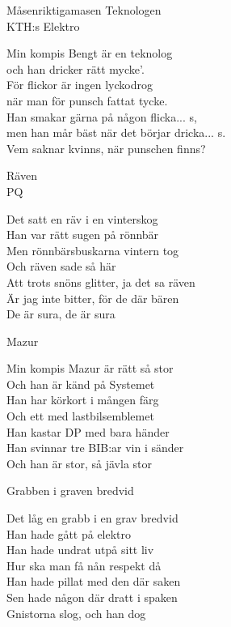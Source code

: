 \begin{song}{Måsen}{riktigamasen}
  {\Large Teknologen}\\{\tiny  KTH:s Elektro}
  \begin{vers}
Min kompis Bengt är en teknolog \\
och han dricker rätt mycke’. \\
För flickor är ingen lyckodrog \\
när man för punsch fattat tycke. \\
Han smakar gärna på någon flicka... s, \\
men han mår bäst när det börjar dricka... s. \\
Vem saknar kvinns, när punschen finns? \\
\end{vers}
 

  {\Large Räven}\\{\tiny  PQ}
  \begin{vers}
Det satt en räv i en vinterskog\\
Han var rätt sugen på rönnbär\\
Men rönnbärsbuskarna vintern tog\\
Och räven sade så här\\
Att trots snöns glitter, ja det sa räven \\
Är jag inte bitter, för de där bären\\
De är sura, de är sura\\
\end{vers}
 

  {\Large Mazur}
  \begin{vers}
Min kompis Mazur är rätt så stor\\
Och han är känd på Systemet\\
Han har körkort i mången färg\\
Och ett med lastbilsemblemet\\
Han kastar DP med bara händer\\
Han svinnar tre BIB:ar vin i sänder\\
Och han är stor, så jävla stor\\
\end{vers}
 
\newpage
  {\Large Grabben i graven bredvid}
  \begin{vers}
Det låg en grabb i en grav bredvid\\
Han hade gått på elektro\\
Han hade undrat utpå sitt liv\\
Hur ska man få nån respekt då\\
Han hade pillat med den där saken\\
Sen hade någon där dratt i spaken\\
Gnistorna slog, och han dog\\
\end{vers}
 


\end{song}
